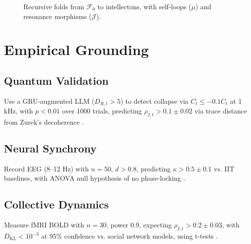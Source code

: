 \documentclass[11pt]{article}
\newcommand{\field}[1]{\mathcal{#1}}
\newcommand{\intellecton}{\mathcal{I}} %
\newcommand{\dkl}{D_{\text{KL}}}
\begin{document}
\begin{figure}[h]
\centering
{}
\caption{Recursive folds from $\field{F}_0$ to intellectons, with self-loops ($\mu$) and resonance morphisms ($\mathcal{J}$).}
\label{fig:lattice}
\end{figure}

\section{Empirical Grounding}
\label{sec:empirical}

\subsection{Quantum Validation}
Use a GRU-augmented LLM ($D_{R,t} > 5$) to detect collapse via $\dot{C}_t \leq -0.1 C_t$ at 1 kHz, with $p < 0.01$ over 1000 trials, predicting $\rho_{I,t} > 0.1 \pm 0.02$ via trace distance from Zurek’s decoherence \citep{engel2023}.

\subsection{Neural Synchrony}
Record EEG (8--12 Hz) with $n = 50$, $d > 0.8$, predicting $\kappa > 0.5 \pm 0.1$ vs. IIT baselines, with ANOVA null hypothesis of no phase-locking \citep{panksepp1998, tononi2023}.

\subsection{Collective Dynamics}
Measure fMRI BOLD with $n = 30$, power 0.9, expecting $\rho_{I,t} > 0.2 \pm 0.03$, with $\dkl < 10^{-3}$ at 95\% confidence vs. social network models, using t-tests \citep{couzin2023}.
\end{document}

